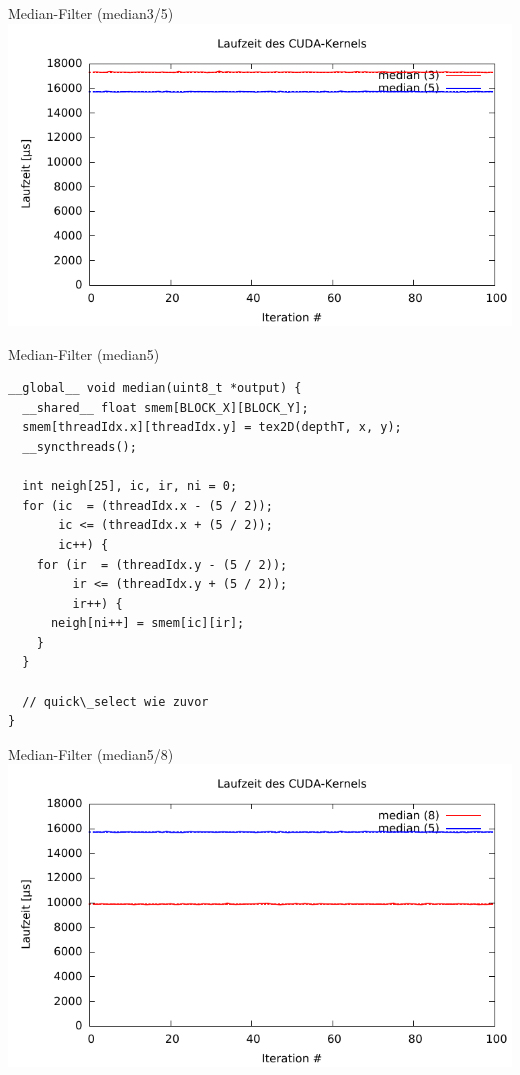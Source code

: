 \documentclass[compress]{beamer}
\begin{document}
\begin{frame}[fragile]{Median-Filter (median3/5)}
\includegraphics[width=\textwidth]{median35.pdf}
\end{frame}


\begin{frame}[fragile]{Median-Filter (median5)}
\begin{lstlisting}
__global__ void median(uint8_t *output) {
  __shared__ float smem[BLOCK_X][BLOCK_Y];
  smem[threadIdx.x][threadIdx.y] = tex2D(depthT, x, y);
  __syncthreads();

  int neigh[25], ic, ir, ni = 0;
  for (ic  = (threadIdx.x - (5 / 2));
       ic <= (threadIdx.x + (5 / 2));
       ic++) {
    for (ir  = (threadIdx.y - (5 / 2));
         ir <= (threadIdx.y + (5 / 2));
         ir++) {
      neigh[ni++] = smem[ic][ir];
    }
  }

  // quick\_select wie zuvor
}
\end{lstlisting}
\end{frame}

\begin{frame}[fragile]{Median-Filter (median5/8)}
\includegraphics[width=\textwidth]{median58.pdf}
\end{frame}
\end{document}
